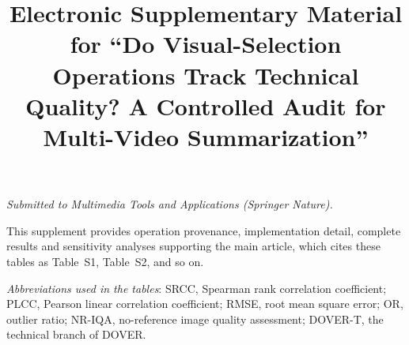 \documentclass[sn-basic,Numbered]{sn-jnl}
\begin{document}


\title[Supplementary material]{Electronic Supplementary Material for
``Do Visual-Selection Operations Track Technical Quality? A Controlled Audit for Multi-Video Summarization''}

\author*[1]{ }
\author[1]{ }

\maketitle

\noindent\small\emph{Submitted to Multimedia Tools and Applications (Springer Nature).}
\normalsize

\renewcommand{\thetable}{S\arabic{table}}
\renewcommand{\theHtable}{S\arabic{table}}
\renewcommand{\thefigure}{S\arabic{figure}}
\renewcommand{\theHfigure}{S\arabic{figure}}
\setcounter{table}{0}



This supplement provides operation provenance, implementation detail, complete results
and sensitivity analyses supporting the main article, which cites these tables as
Table~S1, Table~S2, and so on.

\noindent\small\emph{Abbreviations used in the tables}: SRCC, Spearman rank correlation coefficient; PLCC, Pearson linear correlation coefficient; RMSE, root mean square error; OR, outlier ratio; NR-IQA, no-reference image quality assessment; DOVER-T, the technical branch of DOVER.\normalsize
\end{document}
